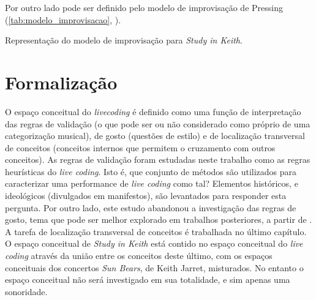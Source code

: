 Por outro lado  pode ser definido pelo modelo de improvisação de Pressing (\autoref{tab:modelo_improvisacao}, \pageref{tab:modelo_improvisacao}).

\begin{example}{Representação do modelo de improvisação para \emph{Study in Keith}.}
\end{example}

\section{Formalização}\label{sec:formaliza}

O espaço conceitual do \emph{livecoding} é definido como uma função de interpretação das regras de validação (o que pode ser ou não considerado como próprio de uma categorização musical), de gosto (questões de estilo) e de localização transversal de conceitos (conceitos internos que permitem o cruzamento com outros conceitos). As regras de validação foram estudadas neste trabalho como as regras heurísticas do \emph{live coding}. Isto é, que conjunto de métodos são utilizados para caracterizar uma performance de \emph{live coding} como tal? Elementos históricos, e ideológicos (divulgados em manifestos), são levantados para responder esta pergunta. Por outro lado, este estudo abandonou a investigação das regras de gosto, tema que pode ser melhor explorado em trabalhos posteriores, a partir de . A tarefa de localização transversal de conceitos é trabalhada no último capítulo. O espaço conceitual de \emph{Study in Keith} está contido no espaço conceitual do \emph{live coding} através da união entre os conceitos deste último, com os espaços conceituais dos concertos \emph{Sun Bears}, de Keith Jarret, misturados. No entanto o espaço conceitual não será investigado em sua totalidade, e sim apenas uma sonoridade.